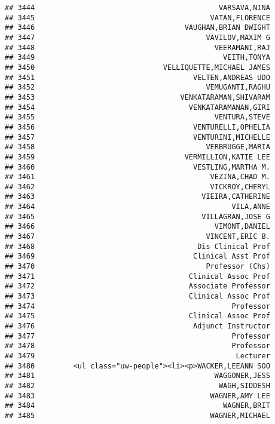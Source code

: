 \documentclass[
]{article}
\begin{document}
\begin{verbatim}
## 3444                                           VARSAVA,NINA
## 3445                                         VATAN,FLORENCE
## 3446                                   VAUGHAN,BRIAN DWIGHT
## 3447                                        VAVILOV,MAXIM G
## 3448                                          VEERAMANI,RAJ
## 3449                                            VEITH,TONYA
## 3450                              VELLIQUETTE,MICHAEL JAMES
## 3451                                     VELTEN,ANDREAS UDO
## 3452                                        VEMUGANTI,RAGHU
## 3453                                  VENKATARAMAN,SHIVARAM
## 3454                                    VENKATARAMANAN,GIRI
## 3455                                          VENTURA,STEVE
## 3456                                     VENTURELLI,OPHELIA
## 3457                                     VENTURINI,MICHELLE
## 3458                                        VERBRUGGE,MARIA
## 3459                                   VERMILLION,KATIE LEE
## 3460                                     VESTLING,MARTHA M.
## 3461                                         VEZINA,CHAD M.
## 3462                                         VICKROY,CHERYL
## 3463                                       VIEIRA,CATHERINE
## 3464                                              VILA,ANNE
## 3465                                       VILLAGRAN,JOSE G
## 3466                                          VIMONT,DANIEL
## 3467                                        VINCENT,ERIC B.
## 3468                                      Dis Clinical Prof
## 3469                                     Clinical Asst Prof
## 3470                                        Professor (Chs)
## 3471                                    Clinical Assoc Prof
## 3472                                    Associate Professor
## 3473                                    Clinical Assoc Prof
## 3474                                              Professor
## 3475                                    Clinical Assoc Prof
## 3476                                     Adjunct Instructor
## 3477                                              Professor
## 3478                                              Professor
## 3479                                               Lecturer
## 3480         <ul class="uw-people"><li><p>WACKER,LEEANN SOO
## 3481                                          WAGGONER,JESS
## 3482                                           WAGH,SIDDESH
## 3483                                         WAGNER,AMY LEE
## 3484                                            WAGNER,BRIT
## 3485                                         WAGNER,MICHAEL

\end{verbatim}
\end{document}
